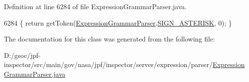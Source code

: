 Definition at line 6284 of file Expression\+Grammar\+Parser.\+java.


\begin{DoxyCode}
6284 \{ \textcolor{keywordflow}{return} getToken(\hyperlink{classgov_1_1nasa_1_1jpf_1_1inspector_1_1server_1_1expression_1_1parser_1_1_expression_grammar_parser}{ExpressionGrammarParser}.\hyperlink{classgov_1_1nasa_1_1jpf_1_1inspector_1_1server_1_1expression_1_1parser_1_1_expression_grammar_parser_a32dffe840b4cc9423cc60e2fe0612b97}{SIGN\_ASTERISK}, 0); \}
\end{DoxyCode}


The documentation for this class was generated from the following file\+:\begin{DoxyCompactItemize}
\item 
D\+:/gsoc/jpf-\/inspector/src/main/gov/nasa/jpf/inspector/server/expression/parser/\hyperlink{_expression_grammar_parser_8java}{Expression\+Grammar\+Parser.\+java}\end{DoxyCompactItemize}
